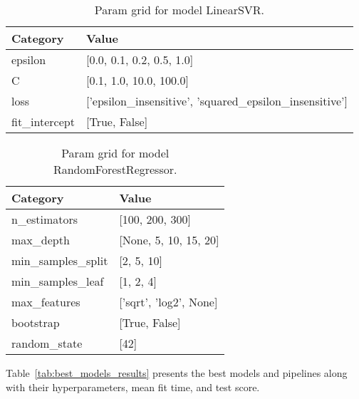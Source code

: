 \documentclass{article}%
\begin{document}
%


\begin{table}[H]%
\begin{center}%
\renewcommand{\arraystretch}{1.5}%
\begin{tabular}{l l}%
\hline%
\textbf{Category}&\textbf{Value}\\%
\hline%
epsilon&{[}0.0, 0.1, 0.2, 0.5, 1.0{]}\\%
C&{[}0.1, 1.0, 10.0, 100.0{]}\\%
loss&{[}'epsilon\_insensitive', 'squared\_epsilon\_insensitive'{]}\\%
fit\_intercept&{[}True, False{]}\\%
\hline%
\end{tabular}%
\end{center}%
\caption{Param grid for model LinearSVR.}%
\end{table}

%


\begin{table}[H]%
\begin{center}%
\renewcommand{\arraystretch}{1.5}%
\begin{tabular}{l l}%
\hline%
\textbf{Category}&\textbf{Value}\\%
\hline%
n\_estimators&{[}100, 200, 300{]}\\%
max\_depth&{[}None, 5, 10, 15, 20{]}\\%
min\_samples\_split&{[}2, 5, 10{]}\\%
min\_samples\_leaf&{[}1, 2, 4{]}\\%
max\_features&{[}'sqrt', 'log2', None{]}\\%
bootstrap&{[}True, False{]}\\%
random\_state&{[}42{]}\\%
\hline%
\end{tabular}%
\end{center}%
\caption{Param grid for model RandomForestRegressor.}%
\end{table}

%
Table~\ref{tab:best_models_results} %
presents the best models and pipelines along with their hyperparameters, mean fit time, and test score.%
\end{document}
